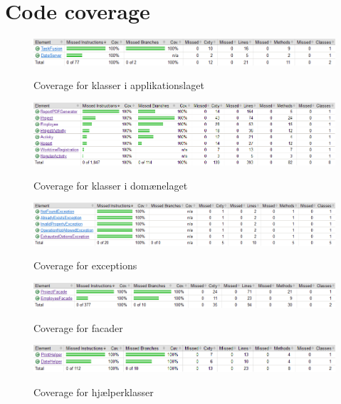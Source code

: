 \section{Code coverage}
\begin{figure}[H]
    \centering
    \caption{Coverage for klasser i applikationslaget}
    \includegraphics[width = 12cm, keepaspectratio]{ImplementationAndTest/Diagrams/coverage/coverage_app.png}
    \label{fig:coverage_app}
\end{figure}
\begin{figure}[H]
    \centering
    \caption{Coverage for klasser i domænelaget}
    \includegraphics[width = 14cm, keepaspectratio]{ImplementationAndTest/Diagrams/coverage/coverage_domain.png}
    \label{fig:coverage_domain}
\end{figure}
\begin{figure}[H]
    \centering
    \caption{Coverage for exceptions}
    \includegraphics[width = 12cm, keepaspectratio]{ImplementationAndTest/Diagrams/coverage/coverage_exceptions.png}
    \label{fig:coverage_exceptions}
\end{figure}
\begin{figure}[H]
    \centering
    \caption{Coverage for facader}
    \includegraphics[width = 12cm, keepaspectratio]{ImplementationAndTest/Diagrams/coverage/coverage_facades.png}
    \label{fig:coverage_facades}
\end{figure}
\begin{figure}[H]
    \centering
    \caption{Coverage for hjælperklasser}
    \includegraphics[width = 12cm, keepaspectratio]{ImplementationAndTest/Diagrams/coverage/coverage_helpers.png}
    \label{fig:coverage_helpers}
\end{figure}
